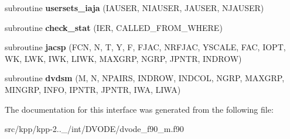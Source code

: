 \begin{DoxyCompactItemize}
\item 
\mbox{\label{interfacedvode__f90__m_1_1dvode__f90_a9beaea733b3803265ba645ce4c0ff5db}} 
subroutine {\bfseries usersets\+\_\+iaja} (I\+A\+U\+S\+ER, N\+I\+A\+U\+S\+ER, J\+A\+U\+S\+ER, N\+J\+A\+U\+S\+ER)
\item 
\mbox{\label{interfacedvode__f90__m_1_1dvode__f90_abfeda3368bcf2f3ba89b0f03f16f79c1}} 
subroutine {\bfseries check\+\_\+stat} (I\+ER, C\+A\+L\+L\+E\+D\+\_\+\+F\+R\+O\+M\+\_\+\+W\+H\+E\+RE)
\item 
\mbox{\label{interfacedvode__f90__m_1_1dvode__f90_a300211e2fef4f271bddb2645153abb91}} 
subroutine {\bfseries jacsp} (F\+CN, N, T, Y, F, F\+J\+AC, N\+R\+F\+J\+AC, Y\+S\+C\+A\+LE, F\+AC, I\+O\+PT, WK, L\+WK, I\+WK, L\+I\+WK, M\+A\+X\+G\+RP, N\+G\+RP, J\+P\+N\+TR, I\+N\+D\+R\+OW)
\item 
\mbox{\label{interfacedvode__f90__m_1_1dvode__f90_af6c3d55a97ef9421a386a46138022cf7}} 
subroutine {\bfseries dvdsm} (M, N, N\+P\+A\+I\+RS, I\+N\+D\+R\+OW, I\+N\+D\+C\+OL, N\+G\+RP, M\+A\+X\+G\+RP, M\+I\+N\+G\+RP, I\+N\+FO, I\+P\+N\+TR, J\+P\+N\+TR, I\+WA, L\+I\+WA)
\end{DoxyCompactItemize}


The documentation for this interface was generated from the following file\+:\begin{DoxyCompactItemize}
\item 
src/kpp/kpp-\/2..\+\_/int/\+D\+V\+O\+D\+E/dvode\+\_\+f90\+\_\+m.\+f90\end{DoxyCompactItemize}
